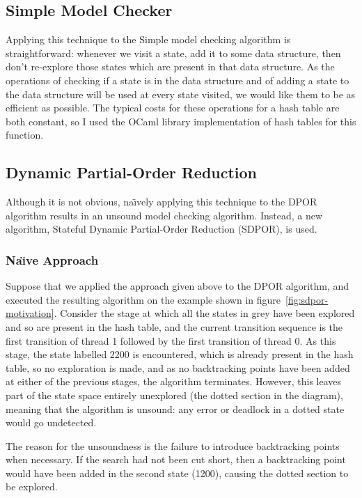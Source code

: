 \documentclass[12pt,a4paper,twoside,openright]{report}
\begin{document}
\subsection{Simple Model Checker}

Applying this technique to the Simple model
checking algorithm is straightforward: whenever
we visit a state, add it to some data structure,
then don't re-explore those states which are
present in that data structure. As the operations
of checking if a state is in the data structure
and of adding a state to the data structure will
be used at every state visited, we would like them
to be as efficient as possible. The typical costs
for these operations for a hash table are both
constant, so I used the OCaml library implementation
of hash tables for this function.

\subsection{Dynamic Partial-Order Reduction}
Although it is not obvious, na\"{\i}vely
applying this technique to the DPOR
algorithm results in an
unsound model checking algorithm. Instead,
a new algorithm, Stateful Dynamic
Partial-Order Reduction (SDPOR), is used.

\subsubsection{Na\"{\i}ve Approach}

Suppose that we applied the approach
given above to the DPOR algorithm,
and executed the resulting algorithm
on the example shown in
figure~\ref{fig:sdpor-motivation}.
Consider the stage at which
all the states in grey have been
explored and so are present in the hash table,
and the current transition sequence is the first
transition of thread 1 followed by the first
transition of thread 0. As this stage, the state
labelled 2200 is encountered, which is already
present in the hash table, so no exploration is
made, and as no backtracking points have been added
at either of the previous stages, the algorithm
terminates. However, this leaves part of the state
space entirely unexplored (the dotted section in
the diagram), meaning that the algorithm is unsound:
any error or deadlock in a dotted state would go
undetected.

The reason for the unsoundness is the failure to
introduce backtracking points when necessary. If the
search had not been cut short, then a backtracking point
would have been added in the second state (1200), causing the
dotted section to be explored.
\end{document}
